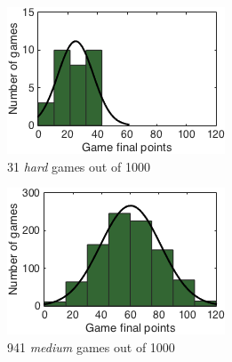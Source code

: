 \cleardoublepage
{}
\label{chapter:appendixA}

\begin{figure}[h]
        \centering
        \begin{subfigure}[h]{0.32\textwidth}
                \includegraphics[width=\textwidth]{./img/appendix/histAhard}
                \caption{31 \emph{hard} games out of 1000}
                \label{app:histAhard}
        \end{subfigure}
        \begin{subfigure}[h]{0.32\textwidth}
                \includegraphics[width=\textwidth]{./img/appendix/histAmedium}
                \caption{941 \emph{medium} games out of 1000}
                \label{app:histAmedium}
        \end{subfigure}
        \begin{subfigure}[h]{0.32\textwidth}

\end{subfigure}
\end{figure}
